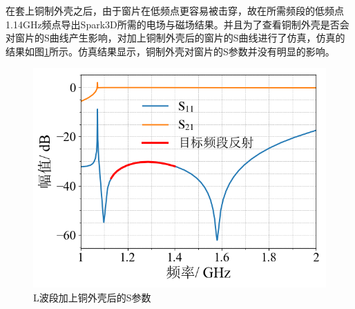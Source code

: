 \documentclass[master]{thesis-uestc}
\begin{document}
在套上铜制外壳之后，由于窗片在低频点更容易被击穿，故在所需频段的低频点1.14GHz频点导出Spark3D所需的电场与磁场结果。并且为了查看铜制外壳是否会对窗片的S曲线产生影响，对加上铜制外壳后的窗片的S曲线进行了仿真，仿真的结果如图\ref{fig:L波段加上铜外壳后的S参数}所示。仿真结果显示，铜制外壳对窗片的S参数并没有明显的影响。

\begin{figure}[!htb]
    \centering
    \includegraphics[width=0.43\linewidth]{pic/chapter4/L波段加上铜外壳后的S参数.png}
    \caption{L波段加上铜外壳后的S参数}
    \label{fig:L波段加上铜外壳后的S参数}
\end{figure}
\end{document}
